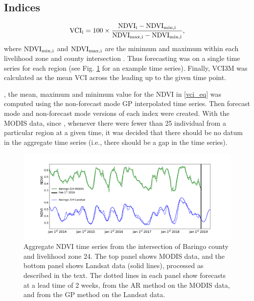 \documentclass[review]{elsarticle}
\begin{document}
\subsection{Indices}

\begin{equation}
\rm{VCI}_i = 100 \times \frac{\rm{NDVI}_i - \rm{NDVI}_{min,i}}{ \rm{NDVI}_{max,i} - \rm{NDVI}_{min,i}},
\label{vci_eq}
\end{equation}
%
where $\rm{NDVI}_{min,i}$ and $\rm{NDVI}_{max,i}$ are the minimum and maximum   within each livelihood zone and county intersection . Thus forecasting was  on a single time series for each region (see Fig. \ref{fig:ndvi_lk} for an example time series). Finally, VCI3M was calculated as the mean VCI across the  leading up to the given time point. 

, the mean, maximum and minimum value for the NDVI in \eqref{vci_eq} was computed using the non-forecast mode GP interpolated time series. Then forecast mode and non-forecast mode versions of each index were created. With the MODIS data, since , whenever there were fewer than 25 individual  from a particular region at a given time, it was decided that there should be no datum in the aggregate  time series (i.e., there should be a gap in the time series). 

\begin{figure}
	\centering
	\includegraphics[trim = 50mm 0mm 0mm 0mm,width=13.5 cm]{figures/NDVI2.pdf} 
	\caption{Aggregate NDVI time series from the intersection of Baringo county and livelihood zone 24. The top panel shows MODIS data, and the bottom panel shows Landsat data (solid lines), processed as described in the text. The dotted lines in each panel show forecasts at a lead time of 2 weeks, from the AR method on the MODIS data, and from the GP method on the Landsat data.} \label{fig:ndvi_lk}
\end{figure}
\end{document}
